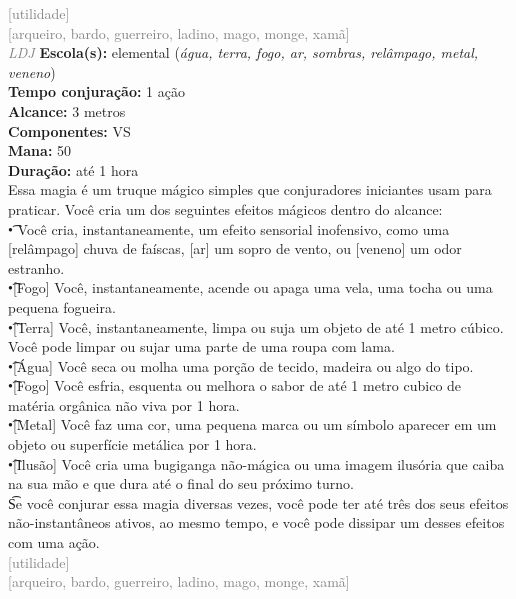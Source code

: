 \documentclass{RPG_Adventure}[2021/10/20]
\begin{document}
{\scriptsize \textcolor{gray}{[utilidade]\\}}
{\scriptsize \textcolor{gray}{[arqueiro, bardo, guerreiro, ladino, mago, monge, xamã]\\}}
{\tiny \textcolor{gray}{\textit{LDJ}}}\jump{}
{\small \t \textbf{Escola(s):} elemental (\textit{água, terra, fogo, ar, sombras, relâmpago, metal, veneno})\\\t \textbf{Tempo conjuração:} 1 ação\\\t \textbf{Alcance:} 3 metros\\\t \textbf{Componentes:} VS\\\t \textbf{Mana:} 50\\\t \textbf{Duração:} até 1 hora\\}
{\normalsize Essa magia é um truque mágico simples que conjuradores iniciantes usam para praticar. Você cria um dos seguintes efeitos mágicos dentro do alcance:\\\t • Você cria, instantaneamente, um efeito sensorial inofensivo, como uma [relâmpago] chuva de faíscas, [ar] um sopro de vento, ou [veneno] um odor estranho.\\\t •[Fogo] Você, instantaneamente, acende ou apaga uma vela, uma tocha ou uma pequena fogueira.\\\t •[Terra] Você, instantaneamente, limpa ou suja um objeto de até 1 metro cúbico. Você pode limpar ou sujar uma parte de uma roupa com lama.\\\t •[Água] Você seca ou molha uma porção de tecido, madeira ou algo do tipo.\\\t •[Fogo] Você esfria, esquenta ou melhora o sabor de até 1 metro cubico de matéria orgânica não viva por 1 hora.\\\t •[Metal] Você faz uma cor, uma pequena marca ou um símbolo aparecer em um objeto ou superfície metálica por 1 hora.\\\t •[Ilusão] Você cria uma bugiganga não-mágica ou uma imagem ilusória que caiba na sua mão e que dura até o final do seu próximo turno.\\\t Se você conjurar essa magia diversas vezes, você pode ter até três dos seus efeitos não-instantâneos ativos, ao mesmo tempo, e você pode dissipar um desses efeitos com uma ação.\\}
{\scriptsize \textcolor{gray}{[utilidade]\\}}
{\scriptsize \textcolor{gray}{[arqueiro, bardo, guerreiro, ladino, mago, monge, xamã]\\}}
\end{document}
